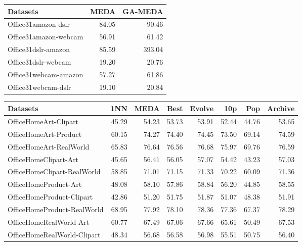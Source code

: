 \documentclass[a4paper]{article}
\begin{document}
	\begin{tabular}{lrr}
		\toprule
		Datasets &   MEDA &  GA-MEDA \\
		\midrule
		Office31amazon-dslr &  84.05 &    90.46 \\
		Office31amazon-webcam &  56.91 &    61.42 \\
		Office31dslr-amazon &  85.59 &   393.04 \\
		Office31dslr-webcam &  19.20 &    20.76 \\
		Office31webcam-amazon &  57.27 &    61.86 \\
		Office31webcam-dslr &  19.10 &    20.84 \\
		\bottomrule
	\end{tabular}
	
	\begin{tabular}{lrrrrrrr}
		\toprule
		Datasets &    1NN &   MEDA &   Best &  Evolve &    10p &    Pop &  Archive \\
		\midrule
		OfficeHomeArt-Clipart &  45.29 &  54.23 &  53.73 &   53.91 &  52.44 &  44.76 &    53.65 \\
		OfficeHomeArt-Product &  60.15 &  74.27 &  74.40 &   74.45 &  73.50 &  69.14 &    74.59 \\
		OfficeHomeArt-RealWorld &  65.83 &  76.64 &  76.56 &   76.68 &  75.97 &  69.76 &    76.59 \\
		OfficeHomeClipart-Art &  45.65 &  56.41 &  56.05 &   57.07 &  54.42 &  43.23 &    57.03 \\
		OfficeHomeClipart-RealWorld &  58.85 &  71.01 &  71.15 &   71.33 &  70.22 &  60.09 &    71.36 \\
		OfficeHomeProduct-Art &  48.08 &  58.10 &  57.86 &   58.84 &  56.20 &  44.85 &    58.55 \\
		OfficeHomeProduct-Clipart &  42.86 &  51.20 &  51.75 &   51.87 &  51.07 &  48.38 &    51.91 \\
		OfficeHomeProduct-RealWorld &  68.95 &  77.92 &  78.10 &   78.36 &  77.36 &  67.37 &    78.29 \\
		OfficeHomeRealWorld-Art &  60.77 &  67.49 &  67.06 &   67.66 &  65.61 &  50.49 &    67.53 \\
		OfficeHomeRealWorld-Clipart &  48.34 &  56.68 &  56.58 &   56.98 &  55.51 &  50.75 &    56.40 \\
		\bottomrule
	\end{tabular}
	
\end{document}
